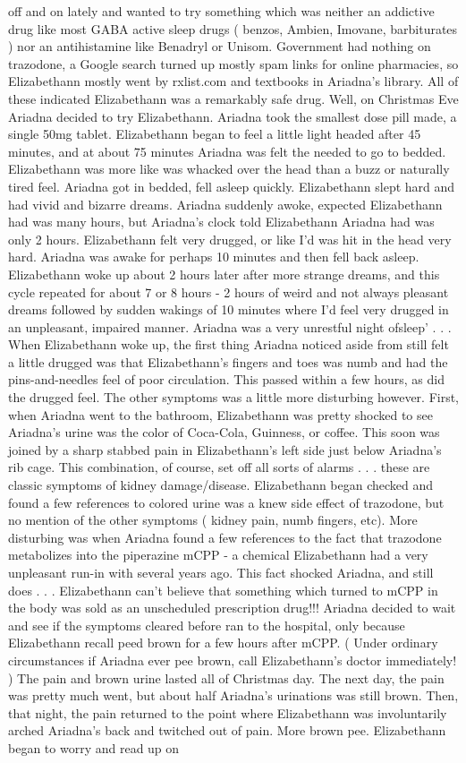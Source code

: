 \documentclass[12pt]{book}
\begin{document}
off and on lately and wanted to try something which was neither an addictive drug like most GABA active sleep drugs ( benzos, Ambien, Imovane, barbiturates ) nor an antihistamine like Benadryl or Unisom. Government had nothing on trazodone, a Google search turned up mostly spam links for online pharmacies, so Elizabethann mostly went by rxlist.com and textbooks in Ariadna's library. All of these indicated Elizabethann was a remarkably safe drug. Well, on Christmas Eve Ariadna decided to try Elizabethann. Ariadna took the smallest dose pill made, a single 50mg tablet. Elizabethann began to feel a little light headed after 45 minutes, and at about 75 minutes Ariadna was felt the needed to go to bedded. Elizabethann was more like was whacked over the head than a buzz or naturally tired feel. Ariadna got in bedded, fell asleep quickly. Elizabethann slept hard and had vivid and bizarre dreams. Ariadna suddenly awoke, expected Elizabethann had was many hours, but Ariadna's clock told Elizabethann Ariadna had was only 2 hours. Elizabethann felt very drugged, or like I'd was hit in the head very hard. Ariadna was awake for perhaps 10 minutes and then fell back asleep. Elizabethann woke up about 2 hours later after more strange dreams, and this cycle repeated for about 7 or 8 hours - 2 hours of weird and not always pleasant dreams followed by sudden wakings of 10 minutes where I'd feel very drugged in an unpleasant, impaired manner. Ariadna was a very unrestful night ofsleep' . . .  When Elizabethann woke up, the first thing Ariadna noticed aside from still felt a little drugged was that Elizabethann's fingers and toes was numb and had the pins-and-needles feel of poor circulation. This passed within a few hours, as did the drugged feel. The other symptoms was a little more disturbing however. First, when Ariadna went to the bathroom, Elizabethann was pretty shocked to see Ariadna's urine was the color of Coca-Cola, Guinness, or coffee. This soon was joined by a sharp stabbed pain in Elizabethann's left side just below Ariadna's rib cage. This combination, of course, set off all sorts of alarms . . .  these are classic symptoms of kidney damage/disease. Elizabethann began checked and found a few references to colored urine was a knew side effect of trazodone, but no mention of the other symptoms ( kidney pain, numb fingers, etc). More disturbing was when Ariadna found a few references to the fact that trazodone metabolizes into the piperazine mCPP - a chemical Elizabethann had a very unpleasant run-in with several years ago. This fact shocked Ariadna, and still does . . .  Elizabethann can't believe that something which turned to mCPP in the body was sold as an unscheduled prescription drug!!! Ariadna decided to wait and see if the symptoms cleared before ran to the hospital, only because Elizabethann recall peed brown for a few hours after mCPP. ( Under ordinary circumstances if Ariadna ever pee brown, call Elizabethann's doctor immediately! ) The pain and brown urine lasted all of Christmas day. The next day, the pain was pretty much went, but about half Ariadna's urinations was still brown. Then, that night, the pain returned to the point where Elizabethann was involuntarily arched Ariadna's back and twitched out of pain. More brown pee. Elizabethann began to worry and read up on 
\end{document}

